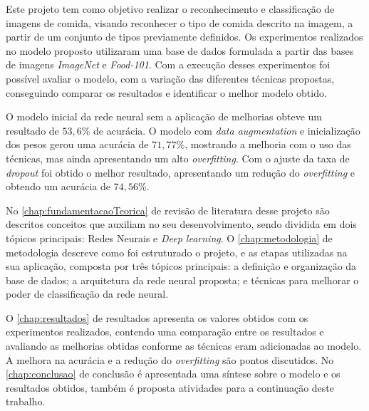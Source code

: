 \par Este projeto tem como objetivo realizar o reconhecimento e classificação de imagens de comida, visando reconhecer o tipo de comida descrito na imagem, a partir de um conjunto de tipos previamente definidos. Os experimentos realizados no modelo proposto utilizaram uma base de dados formulada a partir das bases de imagens \textit{ImageNet}\cite{deng2009imagenet} e \textit{Food-101}\cite{bossard14}. Com a execução desses experimentos foi possível avaliar o modelo, com a variação das diferentes técnicas propostas, conseguindo comparar os resultados e identificar o melhor modelo obtido. 

\par O modelo inicial da rede neural sem a aplicação de melhorias obteve um resultado de $53,6\%$ de acurácia. O modelo com \textit{data augmentation} e inicialização dos pesos gerou uma acurácia de $71,77\%$, mostrando a melhoria com o uso das técnicas, mas ainda apresentando um alto \textit{overfitting}. Com o ajuste da taxa de \textit{dropout} foi obtido o melhor resultado, apresentando um redução do \textit{overfitting} e obtendo um acurácia de $ 74,56\%$.


\par No \autoref{chap:fundamentacaoTeorica} de revisão de literatura desse projeto são descritos conceitos que auxiliam no seu desenvolvimento, sendo dividida em dois tópicos principais: Redes Neurais e \textit{Deep learning}. O \autoref{chap:metodologia} de metodologia descreve como foi estruturado o projeto, e as etapas utilizadas na sua aplicação, composta por três tópicos principais: a definição e organização da base de dados; a arquitetura da rede neural proposta; e técnicas para melhorar o poder de classificação da rede neural.
\par O \autoref{chap:resultados} de resultados apresenta os valores obtidos com os experimentos realizados, contendo uma comparação entre os resultados e avaliando as melhorias obtidas conforme as técnicas eram adicionadas ao modelo. A melhora na acurácia e a redução do \textit{overfitting} são pontos discutidos. No \autoref{chap:conclusao} de conclusão é apresentada uma síntese sobre o modelo e os resultados obtidos, também é proposta atividades para a continuação deste trabalho.
